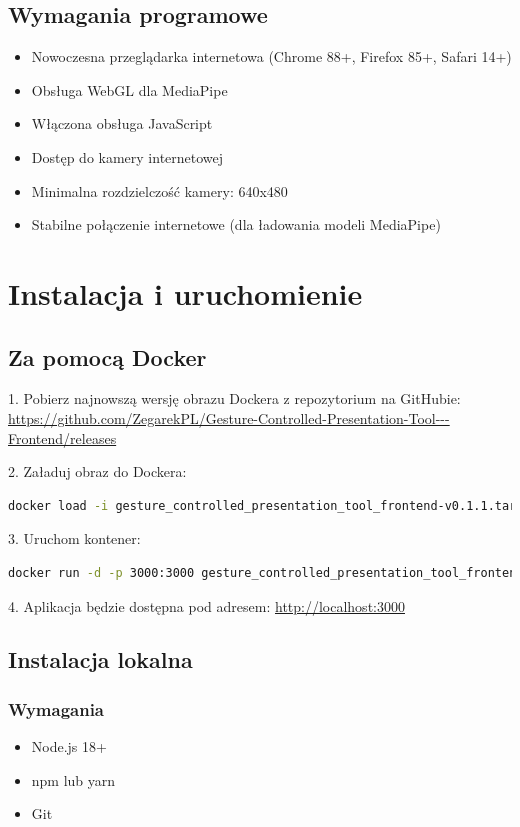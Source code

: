 \documentclass[12pt,a4paper]{article}
\begin{document}
\subsection{Wymagania programowe}
\begin{itemize}
    \item Nowoczesna przeglądarka internetowa (Chrome 88+, Firefox 85+, Safari 14+)
    \item Obsługa WebGL dla MediaPipe
    \item Włączona obsługa JavaScript
    \item Dostęp do kamery internetowej
    \item Minimalna rozdzielczość kamery: 640x480
    \item Stabilne połączenie internetowe (dla ładowania modeli MediaPipe)
\end{itemize}

\section{Instalacja i uruchomienie}

\subsection{Za pomocą Docker}
1. Pobierz najnowszą wersję obrazu Dockera z repozytorium na GitHubie:
\url{https://github.com/ZegarekPL/Gesture-Controlled-Presentation-Tool---Frontend/releases}

2. Załaduj obraz do Dockera:
\begin{lstlisting}[language=bash]
    docker load -i gesture_controlled_presentation_tool_frontend-v0.1.1.tar
\end{lstlisting}

3. Uruchom kontener:
\begin{lstlisting}[language=bash]
    docker run -d -p 3000:3000 gesture_controlled_presentation_tool_frontend:v0.1.1
\end{lstlisting}

4. Aplikacja będzie dostępna pod adresem: \url{http://localhost:3000}

\subsection{Instalacja lokalna}
\subsubsection{Wymagania}
\begin{itemize}
    \item Node.js 18+ 
    \item npm lub yarn
    \item Git
\end{itemize}
\end{document}
